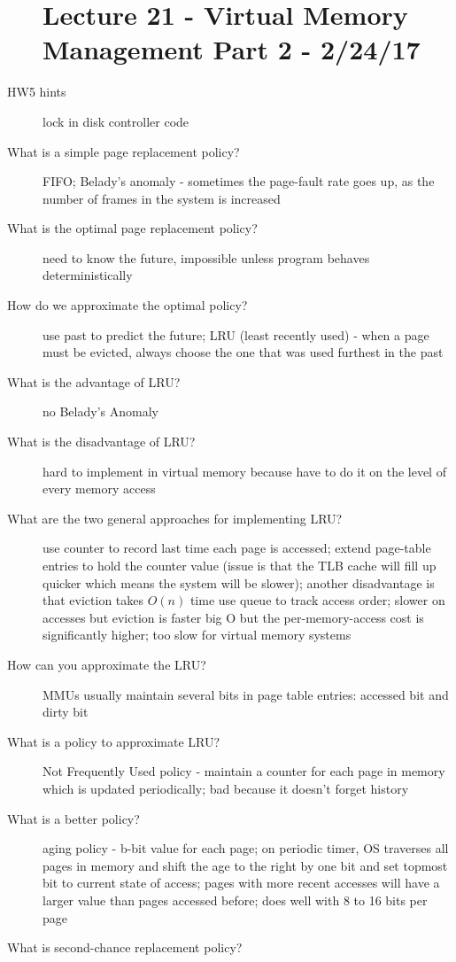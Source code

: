 \documentclass[10pt]{article}
\begin{document}
\begin{description}
\section{Lecture 21 - Virtual Memory Management Part 2 - 2/24/17}
\item[HW5 hints]
  lock in disk controller code
\item[What is a simple page replacement policy?]
  FIFO;
  Belady's anomaly - sometimes the page-fault rate goes up, as the number of frames in the system is increased
\item[What is the optimal page replacement policy?]
  need to know the future, impossible unless program behaves deterministically
\item[How do we approximate the optimal policy?]
  use past to predict the future;
  LRU (least recently used) - when a page must be evicted, always choose the one that was used furthest in the past
\item[What is the advantage of LRU?]
  no Belady's Anomaly
\item[What is the disadvantage of LRU?]
  hard to implement in virtual memory because have to do it on the level of every memory access
\item[What are the two general approaches for implementing LRU?]
  use counter to record last time each page is accessed;
  extend page-table entries to hold the counter value (issue is that the TLB cache will fill up quicker which means the system will be slower);
  another disadvantage is that eviction takes $O(n)$ time
  use queue to track access order;
  slower on accesses but eviction is faster big O but the per-memory-access cost is significantly higher;
  too slow for virtual memory systems
\item[How can you approximate the LRU?]
  MMUs usually maintain several bits in page table entries: accessed bit and dirty bit
\item[What is a policy to approximate LRU?]
  Not Frequently Used policy - maintain a counter for each page in memory which is updated periodically;
  bad because it doesn't forget history
\item[What is a better policy?]
  aging policy - b-bit value for each page;
  on periodic timer, OS traverses all pages in memory and shift the age to the right by one bit and set topmost bit to current state of access;
  pages with more recent accesses will have a larger value than pages accessed before;
  does well with 8 to 16 bits per page
\item[What is second-chance replacement policy?]

\end{description}
\end{document}
